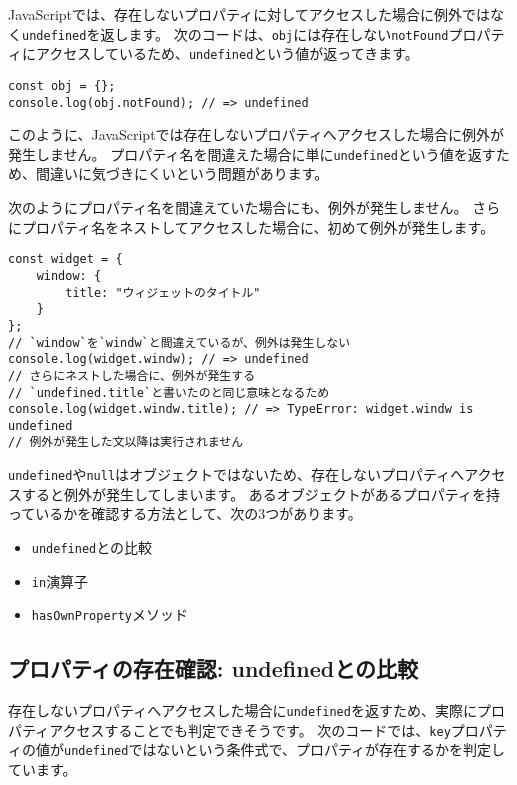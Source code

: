 JavaScriptでは、存在しないプロパティに対してアクセスした場合に例外ではなく\texttt{undefined}を返します。
次のコードは、\texttt{obj}には存在しない\texttt{notFound}プロパティにアクセスしているため、\texttt{undefined}という値が返ってきます。

\begin{lstlisting}
const obj = {};
console.log(obj.notFound); // => undefined
\end{lstlisting}

このように、JavaScriptでは存在しないプロパティへアクセスした場合に例外が発生しません。
プロパティ名を間違えた場合に単に\texttt{undefined}という値を返すため、間違いに気づきにくいという問題があります。

次のようにプロパティ名を間違えていた場合にも、例外が発生しません。
さらにプロパティ名をネストしてアクセスした場合に、初めて例外が発生します。

\begin{lstlisting}
const widget = {
    window: {
        title: "ウィジェットのタイトル"
    }
};
// `window`を`windw`と間違えているが、例外は発生しない
console.log(widget.windw); // => undefined
// さらにネストした場合に、例外が発生する
// `undefined.title`と書いたのと同じ意味となるため
console.log(widget.windw.title); // => TypeError: widget.windw is undefined
// 例外が発生した文以降は実行されません
\end{lstlisting}

\texttt{undefined}や\texttt{null}はオブジェクトではないため、存在しないプロパティへアクセスすると例外が発生してしまいます。
あるオブジェクトがあるプロパティを持っているかを確認する方法として、次の3つがあります。

\begin{itemize}
\item
  \texttt{undefined}との比較
\item
  \texttt{in}演算子
\item
  \texttt{hasOwnProperty}メソッド
\end{itemize}

\hypertarget{compare-to-undefined}{%
\subsection{プロパティの存在確認:
undefinedとの比較}\label{compare-to-undefined}}

存在しないプロパティへアクセスした場合に\texttt{undefined}を返すため、実際にプロパティアクセスすることでも判定できそうです。
次のコードでは、\texttt{key}プロパティの値が\texttt{undefined}ではないという条件式で、プロパティが存在するかを判定しています。

